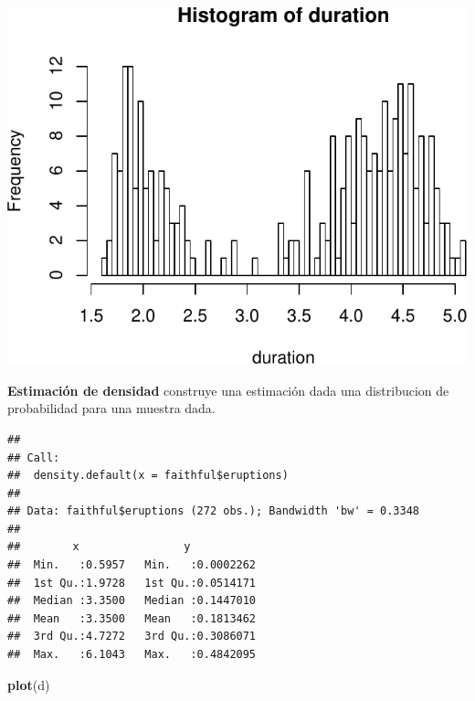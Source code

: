 \documentclass[]{article}
\newenvironment{Shaded}{\begin{snugshade}}{\end{snugshade}}
\newcommand{\KeywordTok}[1]{\textcolor[rgb]{0.13,0.29,0.53}{\textbf{{#1}}}}
\newcommand{\StringTok}[1]{\textcolor[rgb]{0.31,0.60,0.02}{{#1}}}
\newcommand{\NormalTok}[1]{{#1}}
\numberwithin{equation}{section}
\begin{document}
\includegraphics{tema1_files/figure-latex/unnamed-chunk-107-2.pdf}

\textbf{Estimación de densidad} construye una estimación dada una
distribucion de probabilidad para una muestra dada.

\begin{Shaded}
\end{Shaded}

\begin{verbatim}
## 
## Call:
##  density.default(x = faithful$eruptions)
## 
## Data: faithful$eruptions (272 obs.); Bandwidth 'bw' = 0.3348
## 
##        x                y            
##  Min.   :0.5957   Min.   :0.0002262  
##  1st Qu.:1.9728   1st Qu.:0.0514171  
##  Median :3.3500   Median :0.1447010  
##  Mean   :3.3500   Mean   :0.1813462  
##  3rd Qu.:4.7272   3rd Qu.:0.3086071  
##  Max.   :6.1043   Max.   :0.4842095
\end{verbatim}

\begin{Shaded}
\begin{Highlighting}[]
\KeywordTok{plot}\NormalTok{(d)}
\end{Highlighting}
\end{Shaded}
\end{document}

